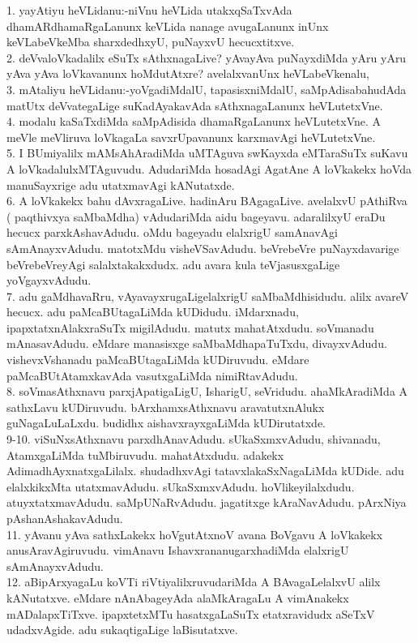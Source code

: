 \documentclass{article}
\begin{document}
1. yayAtiyu heVLidanu:-niVnu heVLida utakxqSaTxvAda dhamARdhamaRgaLanunx keVLida nanage avugaLanunx inUnx keVLabeVkeMba sharxdedhxyU, puNayxvU hecucxtitxve.\\
2. deVvaloVkadalilx eSuTx sAthxnagaLive? yAvayAva puNayxdiMda yAru yAru yAva yAva loVkavanunx hoMdutAtxre? avelalxvanUnx heVLabeVkenalu,\\
3. mAtaliyu heVLidanu:-yoVgadiMdalU, tapasisxniMdalU, saMpAdisabahudAda matUtx deVvategaLige suKadAyakavAda sAthxnagaLanunx heVLutetxVne.\\
4. modalu kaSaTxdiMda saMpAdisida dhamaRgaLanunx heVLutetxVne. A meVle meVliruva loVkagaLa savxrUpavanunx karxmavAgi heVLutetxVne.\\
5. I BUmiyalilx mAMsAhAradiMda uMTAguva swKayxda eMTaraSuTx suKavu A loVkadalulxMTAguvudu. AdudariMda hosadAgi AgatAne A loVkakekx hoVda manuSayxrige adu utatxmavAgi kANutatxde.\\
6. A loVkakekx bahu dAvxragaLive. hadinAru BAgagaLive. avelalxvU pAthiRva ( paqthivxya saMbaMdha) vAdudariMda aidu bageyavu. adaralilxyU eraDu hecucx parxkAshavAdudu. oMdu bageyadu elalxrigU samAnavAgi sAmAnayxvAdudu. matotxMdu visheVSavAdudu. beVrebeVre puNayxdavarige beVrebeVreyAgi salalxtakakxdudx. adu avara kula teVjasusxgaLige yoVgayxvAdudu.\\
7. adu gaMdhavaRru, vAyavayxrugaLigelalxrigU saMbaMdhisidudu. alilx avareV hecucx. adu paMcaBUtagaLiMda kUDidudu. iMdarxnadu, ipapxtatxnAlakxraSuTx migilAdudu. matutx mahatAtxdudu. soVmanadu mAnasavAdudu. eMdare manasisxge saMbaMdhapaTuTxdu, divayxvAdudu. vishevxVshanadu paMcaBUtagaLiMda kUDiruvudu. eMdare paMcaBUtAtamxkavAda vasutxgaLiMda nimiRtavAdudu.\\
8. soVmasAthxnavu parxjApatigaLigU, IsharigU, seVridudu. ahaMkAradiMda A sathxLavu kUDiruvudu. bArxhamxsAthxnavu aravatutxnAlukx guNagaLuLaLxdu. budidhx aishavxrayxgaLiMda kUDirutatxde.\\
9-10. viSuNxsAthxnavu parxdhAnavAdudu. sUkaSxmxvAdudu, shivanadu, AtamxgaLiMda tuMbiruvudu. mahatAtxdudu. adakekx AdimadhAyxnatxgaLilalx. shudadhxvAgi tatavxlakaSxNagaLiMda kUDide. adu elalxkikxMta utatxmavAdudu. sUkaSxmxvAdudu. hoVlikeyilalxdudu. atuyxtatxmavAdudu. saMpUNaRvAdudu. jagatitxge kAraNavAdudu. pArxNiya pAshanAshakavAdudu.\\
11. yAvanu yAva sathxLakekx hoVgutAtxnoV avana BoVgavu A loVkakekx anusAravAgiruvudu. vimAnavu IshavxrananugarxhadiMda elalxrigU sAmAnayxvAdudu.\\
12. aBipArxyagaLu koVTi riVtiyalilxruvudariMda A BAvagaLelalxvU alilx kANutatxve. eMdare nAnAbageyAda alaMkAragaLu A vimAnakekx mADalapxTiTxve. ipapxtetxMTu hasatxgaLaSuTx etatxravidudx aSeTxV udadxvAgide. adu sukaqtigaLige laBisutatxve.\\
\end{document}
